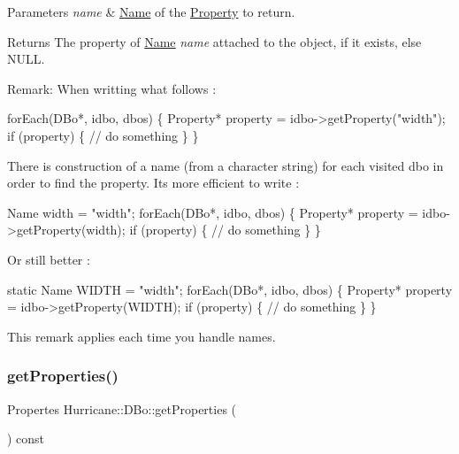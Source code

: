\begin{DoxyParams}{Parameters}
{\em name} & \mbox{\hyperlink{classHurricane_1_1Name}{Name}} of the \mbox{\hyperlink{classHurricane_1_1Property}{Property}} to return. \\
\hline
\end{DoxyParams}
\begin{DoxyReturn}{Returns}
The property of \mbox{\hyperlink{classHurricane_1_1Name}{Name}} {\itshape name} attached to the object, if it exists, else {\ttfamily N\+U\+LL}.
\end{DoxyReturn}
\begin{DoxyParagraph}{Remark\+: When writting what follows \+:}

\begin{DoxyCode}
forEach(DBo*, idbo, dbos) \{
  Property* \textcolor{keyword}{property} = idbo->getProperty(\textcolor{stringliteral}{"width"});
  \textcolor{keywordflow}{if} (property) \{
    \textcolor{comment}{// do something}
  \}
\}
\end{DoxyCode}

\end{DoxyParagraph}
There is construction of a name (from a character string) for each visited dbo in order to find the property. It\textquotesingle{}s more efficient to write \+: 
\begin{DoxyCode}
Name width = \textcolor{stringliteral}{"width"};
forEach(DBo*, idbo, dbos) \{
  Property* \textcolor{keyword}{property} = idbo->getProperty(width);
  \textcolor{keywordflow}{if} (property) \{
    \textcolor{comment}{// do something}
  \}
\}
\end{DoxyCode}
 Or still better \+: 
\begin{DoxyCode}
\textcolor{keyword}{static} Name WIDTH = \textcolor{stringliteral}{"width"};
forEach(DBo*, idbo, dbos) \{
  Property* \textcolor{keyword}{property} = idbo->getProperty(WIDTH);
  \textcolor{keywordflow}{if} (property) \{
    \textcolor{comment}{// do something}
  \}
\}
\end{DoxyCode}
 This remark applies each time you handle names. \mbox{\label{classHurricane_1_1DBo_aec46894a10e83abb54c495dc4d90f2d3}} 
\subsubsection{\texorpdfstring{get\+Properties()}{getProperties()}}
{\footnotesize\ttfamily Propertes Hurricane\+::\+D\+Bo\+::get\+Properties (\begin{DoxyParamCaption}{ }\end{DoxyParamCaption}) const}

